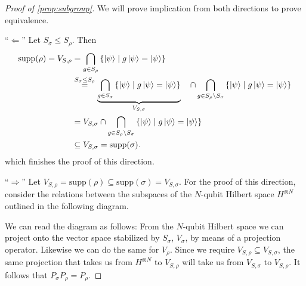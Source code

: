 \begin{proof}[Proof of \cref{prop:subgroup}]
  We will prove implication from both directions to prove equivalence.

  \enquote{$\Leftarrow$} Let $S_\sigma \leq S_\rho$. Then
  \begin{align*}
    \mathrm{supp}(\rho) = V_{S,\rho} &= \bigcap_{g\in S_\rho} \left\{ \ket{\psi} \mid
    g\ket{\psi} = \ket{\psi} \right\} \\
        &\overset{S_\sigma \leq S_\rho}{=} \underbrace{\bigcap_{g\in S_\sigma}
        \left\{\ket{\psi} \mid g \ket{\psi} =
        \ket{\psi}\right\}}_{V_{S,\sigma}}\ \ \ \cap \bigcap_{g \in S_\rho \setminus
        S_\sigma} \left\{\ket{\psi} \mid g \ket{\psi} =
        \ket{\psi}\right\}\\
        &= V_{S,\sigma} \cap \bigcap_{g \in S_\rho \setminus
        S_\sigma} \left\{\ket{\psi} \mid g \ket{\psi} =
        \ket{\psi}\right\}\\
        &\subseteq V_{S,\sigma} = \mathrm{supp}(\sigma)
  .\end{align*}
  which finishes the proof of this direction.

  \enquote{$\Rightarrow$} Let $V_{S,\rho} = \mathrm{supp}(\rho) \subseteq
  \mathrm{supp}(\sigma) = V_{S,\sigma}$. 
  For the proof of this direction, consider the relations between the subspaces
  of the $N$-qubit Hilbert space $H^{\otimes N}$ outlined in the following
  diagram.
  \begin{figure}[h]
    \centering
\end{figure}

  We can read the diagram as follows: From the $N$-qubit Hilbert space we can
  project onto the vector space stabilized by $S_\sigma$, $V_\sigma$, by means of a
  projection operator. Likewise we can do the same for $V_\rho$. Since we
  require $V_{S,\rho} \subseteq V_{S,\sigma}$, the same projection that takes
  us from $H^{\otimes N}$ to $V_{S,\rho}$ will take us from $V_{S,\sigma}$ to
  $V_{S,\rho}$. It follows that $P_\sigma P_\rho = P_\rho$.


\end{proof}
